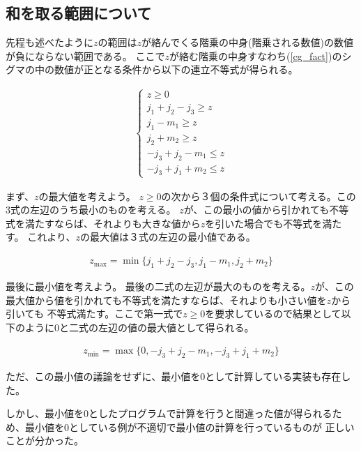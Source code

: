 \subsection{和を取る範囲について}

先程も述べたように$z$の範囲は$z$が絡んでくる階乗の中身(階乗される数値)の数値が負にならない範囲である。
ここで$z$が絡む階乗の中身すなわち(\ref{cg_fact})のシグマの中の数値が正となる条件から以下の連立不等式が得られる。

\begin{align}
    \begin{cases}
        z \ge 0  \tag{a}\\ 
        j_1 + j_2 - j_3 \ge z \\ 
        j_1 - m_1 \ge z \\
        j_2 + m_2 \ge z \\
        -j_3 + j_2 - m_1 \le z \\
        -j_3 + j_1 + m_2 \le z
    \end{cases}
\end{align}

まず、$z$の最大値を考えよう。
$z \ge 0$の次から３個の条件式について考える。この3式の左辺のうち最小のものを考える。
$z$が、この最小の値から引かれても不等式を満たすならば、それよりも大きな値から$z$を引いた場合でも不等式を満たす。
これより、$z$の最大値は３式の左辺の最小値である。

\begin{align}
    z_{\text{max}} = \min\{j_1 + j_2 - j_3, j_1 - m_1, j_2 + m_2\}
\end{align}

最後に最小値を考えよう。
最後の二式の左辺が最大のものを考える。$z$が、この最大値から値を引かれても不等式を満たすならば、それよりも小さい値を$z$から引いても
不等式満たす。ここで第一式で$z \ge 0$を要求しているので結果として以下のように$0$と二式の左辺の値の最大値として得られる。

\begin{align}
    z_{\text{min}} = \max\{0, -j_3 + j_2 - m_1, -j_3 + j_1 + m_2\}
\end{align}


ただ、この最小値の議論をせずに、最小値を$0$として計算している実装も存在した。

しかし、最小値を$0$としたプログラムで計算を行うと間違った値が得られるため、最小値を$0$としている例が不適切で最小値の計算を行っているものが
正しいことが分かった。

\begin{comment}
また$n_{min},n_{max}$はそれぞれ以下で定義する
\begin{align}
    \begin{cases}
        n_{\text{min}} &= \max\{0,J_2 + m_2 - (J_3 + m_3), J_1 - m_1 - (J_3 - m_3)\} \\ 
                       &= \max\{0,J_2 - J_3 - m_1, J_1 - J_3 + m_2 \} \\ 
        n_{\text{max}} &= \min\{J_1 + J_2 - J_3, J_2 + m_2, J_1 - m_1\} \\ 
    \end{cases}
\end{align}
\end{comment}
